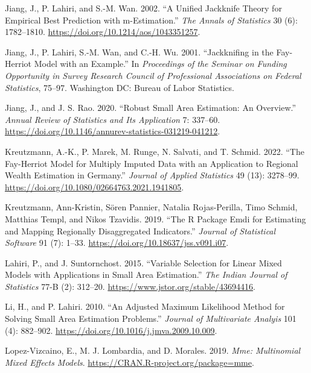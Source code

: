 \begin{CSLReferences}{1}{0}
\leavevmode{}%
Jiang, J., P. Lahiri, and S.-M. Wan. 2002. {``A Unified Jackknife Theory for Empirical Best Prediction with m-Estimation.''} \emph{The Annals of Statistics} 30 (6): 1782--1810. \url{https://doi.org/10.1214/aos/1043351257}.

\leavevmode{}%
Jiang, J., P. Lahiri, S.-M. Wan, and C.-H. Wu. 2001. {``Jackknifing in the {Fay-Herriot} Model with an Example.''} In \emph{Proceedings of the Seminar on Funding Opportunity in Survey Research Council of Professional Associations on Federal Statistics}, 75--97. Washington DC: Bureau of Labor Statistics.

\leavevmode{}%
Jiang, J., and J. S. Rao. 2020. {``Robust Small Area Estimation: An Overview.''} \emph{Annual Review of Statistics and Its Application} 7: 337--60. \url{https://doi.org/10.1146/annurev-statistics-031219-041212}.

\leavevmode{}%
Kreutzmann, A.-K., P. Marek, M. Runge, N. Salvati, and T. Schmid. 2022. {``The {Fay-Herriot} Model for Multiply Imputed Data with an Application to Regional Wealth Estimation in {Germany}.''} \emph{Journal of Applied Statistics} 49 (13): 3278--99. \url{https://doi.org/10.1080/02664763.2021.1941805}.

\leavevmode{}%
Kreutzmann, Ann-Kristin, Sören Pannier, Natalia Rojas-Perilla, Timo Schmid, Matthias Templ, and Nikos Tzavidis. 2019. {``The {R} Package Emdi for Estimating and Mapping Regionally Disaggregated Indicators.''} \emph{Journal of Statistical Software} 91 (7): 1--33. \url{https://doi.org/10.18637/jss.v091.i07}.

\leavevmode{}%
Lahiri, P., and J. Suntornchost. 2015. {``Variable Selection for Linear Mixed Models with Applications in Small Area Estimation.''} \emph{The Indian Journal of Statistics} 77-B (2): 312--20. \url{https://www.jstor.org/stable/43694416}.

\leavevmode{}%
Li, H., and P. Lahiri. 2010. {``An Adjusted Maximum Likelihood Method for Solving Small Area Estimation Problems.''} \emph{Journal of Multivariate Analyis} 101 (4): 882--902. \url{https://doi.org/10.1016/j.jmva.2009.10.009}.

\leavevmode{}%
Lopez-Vizcaino, E., M. J. Lombardia, and D. Morales. 2019. \emph{Mme: Multinomial Mixed Effects Models}. \url{https://CRAN.R-project.org/package=mme}.


\end{CSLReferences}
